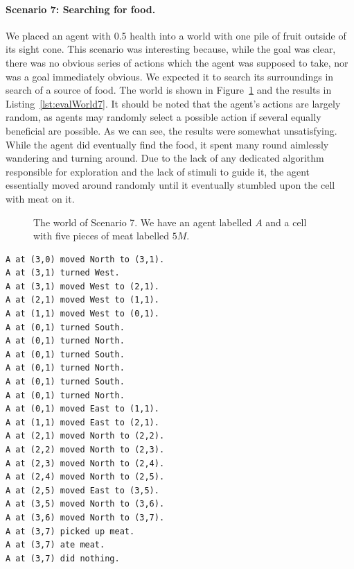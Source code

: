 \paragraph{Scenario 7: Searching for food.} We placed an agent with 0.5 health into a world with one pile of fruit outside of its sight cone. This scenario was interesting because, while the goal was clear, there was no obvious series of actions which the agent was supposed to take, nor was a goal immediately obvious. We expected it to search its surroundings in search of a source of food. The world is shown in Figure~\ref{fig:evalWorld7} and the results in Listing~\ref{lst:evalWorld7}. It should be noted that the agent's actions are largely random, as agents may randomly select a possible action if several equally beneficial are possible. As we can see, the results were somewhat unsatisfying. While the agent did eventually find the food, it spent many round aimlessly wandering and turning around. Due to the lack of any dedicated algorithm responsible for exploration and the lack of stimuli to guide it, the agent essentially moved around randomly until it eventually stumbled upon the cell with meat on it.

\begin{figure}[t]
    \centering
    
    \caption{The world of Scenario 7. We have an agent labelled $A$ and a cell with five pieces of meat labelled $5M$.}
    \label{fig:evalWorld7}
\end{figure}

\begin{lstlisting}[caption=Actions in Scenario 7., label=lst:evalWorld7, float=t]
A at (3,0) moved North to (3,1).
A at (3,1) turned West.
A at (3,1) moved West to (2,1).
A at (2,1) moved West to (1,1).
A at (1,1) moved West to (0,1).
A at (0,1) turned South.
A at (0,1) turned North.
A at (0,1) turned South.
A at (0,1) turned North.
A at (0,1) turned South.
A at (0,1) turned North.
A at (0,1) moved East to (1,1).
A at (1,1) moved East to (2,1).
A at (2,1) moved North to (2,2).
A at (2,2) moved North to (2,3).
A at (2,3) moved North to (2,4).
A at (2,4) moved North to (2,5).
A at (2,5) moved East to (3,5).
A at (3,5) moved North to (3,6).
A at (3,6) moved North to (3,7).
A at (3,7) picked up meat.
A at (3,7) ate meat.
A at (3,7) did nothing.
\end{lstlisting}

